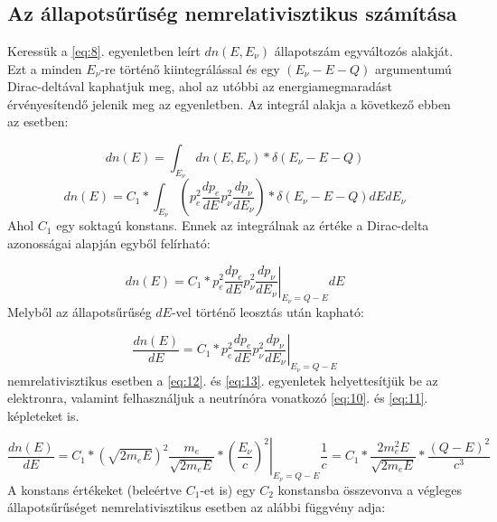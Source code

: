 \appendix
\renewcommand{\thesection}{APPENDIX \Alph{section}}

\section{} \label{appendix:A}

\subsection{Az állapotsűrűség nemrelativisztikus számítása}
Keressük a \ref{eq:8}. egyenletben leírt $dn \left( E, E_{\nu} \right)$ állapotszám egyváltozós alakját. Ezt a minden $E_{\nu}$-re történő kiintegrálással és egy $\left( E_{\nu} - E - Q \right)$ argumentumú Dirac-deltával kaphatjuk meg, ahol az utóbbi az energiamegmaradást érvényesítendő jelenik meg az egyenletben. Az integrál alakja a következő ebben az esetben:

\begin{equation} \label{eq:19}
dn \left( E \right)
=
\int_{E_{\nu}} dn \left( E, E_{\nu} \right) * \delta \left( E_{\nu} - E - Q \right)
\end{equation}
\begin{equation} \label{eq:20}
dn \left( E \right)
=
C_{1} * \int_{E_{\nu}} \left( p_{e}^{2} \frac{dp_{e}}{dE} p_{\nu}^{2} \frac{dp_{\nu}}{dE_{\nu}} \right) * \delta \left( E_{\nu} - E - Q \right) dE dE_{\nu}
\end{equation}
Ahol $C_{1}$ egy soktagú konstans. Ennek az integrálnak az értéke a Dirac-delta azonosságai alapján egyből felírható:

\begin{equation} \label{eq:21}
dn \left( E \right)
=
C_{1} * \left. p_{e}^{2} \frac{dp_{e}}{dE} p_{\nu}^{2} \frac{dp_{\nu}}{dE_{\nu}} \right|_{E_{\nu} = Q - E} dE
\end{equation}
Melyből az állapotsűrűség $dE$-vel történő leosztás után kapható:

\begin{equation} \label{eq:22}
\frac{dn \left( E \right)}{dE}
=
C_{1} * \left. p_{e}^{2} \frac{dp_{e}}{dE} p_{\nu}^{2} \frac{dp_{\nu}}{dE_{\nu}} \right|_{E_{\nu} = Q - E}
\end{equation}
nemrelativisztikus esetben a \ref{eq:12}. és \ref{eq:13}. egyenletek helyettesítjük be az elektronra, valamint felhasználjuk a neutrínóra vonatkozó \ref{eq:10}. és \ref{eq:11}. képleteket is.

\begin{equation} \label{eq:23}
\frac{dn \left( E \right)}{dE}
=
C_{1} * \left( \sqrt{2 m_{e} E} \right)^{2} \frac{m_{e}}{\sqrt{2 m_{e} E}} * \left. \left( \frac{E_{\nu}}{c} \right)^{2} \right|_{E_{\nu} = Q - E} \frac{1}{c}
=
C_{1} * \frac{2 m_{e}^{2} E}{\sqrt{2 m_{e} E}} * \frac{\left( Q - E \right)^{2}}{c^{3}}
\end{equation}
A konstans értékeket (beleértve $C_{1}$-et is) egy $C_{2}$ konstansba összevonva a végleges állapotsűrűséget nemrelativisztikus esetben az alábbi függvény adja:

